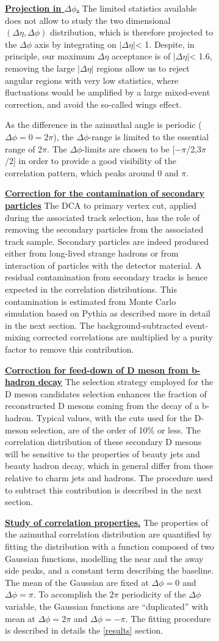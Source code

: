 \begin{enumerate}
\begin{figure}[h]
\begin{figure}
\item
\underline {\bf Projection in $\Delta\phi$.}
The limited statistics available does not allow to study the two dimensional
$(\Delta\eta,\Delta\phi)$ distribution, which is therefore projected to the $\Delta\phi$ axis by integrating on $|\Delta\eta|$< 1. Despite, in principle, our maximum $\Delta\eta$ acceptance is of $|\Delta\eta|$< 1.6, removing the large $|\Delta\eta|$ regions allow us to reject angular regions with very low statistics, where fluctuations would be amplified by a large mixed-event correction, and avoid the so-called wings effect.

As the difference in the azimuthal angle is periodic ($\Delta \phi = 0 = 2\pi$), the $\Delta\phi$-range is limited to the essential range of 2$\pi$. The $\Delta \phi$-limits are chosen to be [$-\pi$/2,3$\pi$/2] in order to provide a good visibility of the correlation pattern, which peaks around 0 and $\pi$.

\item
\underline {\bf Correction for the contamination of secondary particles}
The DCA to primary vertex cut, applied during the associated track selection, has the role of removing the secondary particles from the associated track sample.
Secondary particles are indeed produced either from long-lived strange hadrons or from interaction of particles with the detector material. A residual contamination from secondary tracks is hence expected in the correlation distributions. This contamination is estimated from Monte Carlo simulation
based on Pythia as described more in detail in the next section. The background-subtracted
event-mixing corrected correlations are multiplied by a purity factor to remove this contribution.

\item
\underline {\bf Correction for feed-down of D meson from b-hadron decay}
The selection strategy employed for the D meson candidates selection %
enhances the fraction of reconstructed D mesons coming from the decay of a b-hadron. Typical values, with the cuts used for the D-meson selection, are of the order of 10\% or less. The correlation distribution of these secondary D mesons will be sensitive to the properties of beauty jets and beauty hadron decay, which in general differ from those relative to charm jets and hadrons. The procedure used to subtract this contribution is described in the next section.

\item
\underline{\bf Study of correlation properties.}
The properties of the azimuthal correlation distribution are quantified by
fitting the distribution with a function composed of two Gaussian functions, modelling the near and the away side peaks, and
a constant term describing the baseline. The mean of the Gaussian are fixed at
$\Delta\phi = 0$ and $\Delta\phi = \pi$. To accomplish the $2\pi$ periodicity
of the $\Delta\phi$ variable, the Gaussian functions
are ``duplicated'' with mean at $\Delta\phi = 2\pi$ and $\Delta\phi = -\pi$.
The fitting procedure is described in details the \ref{results} section.



\end{figure}
\end{figure}
\end{enumerate}
